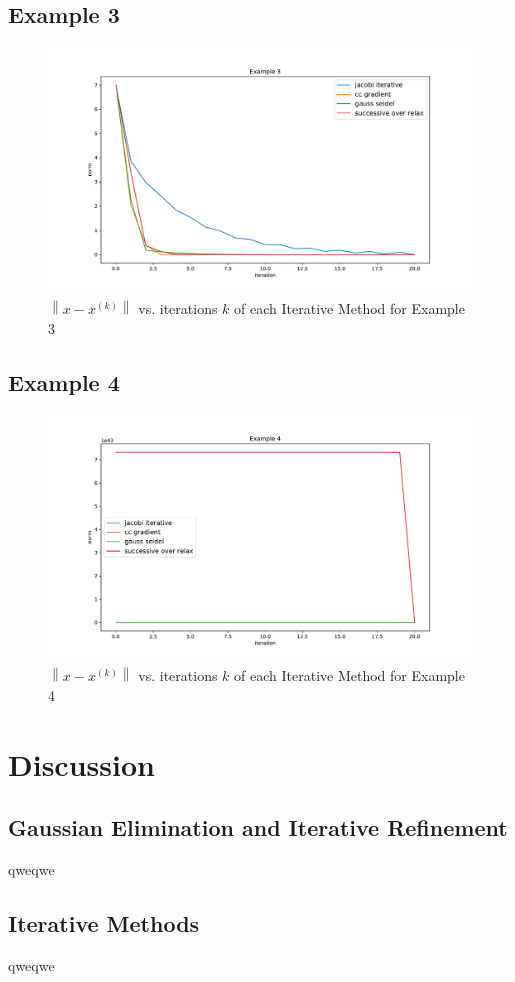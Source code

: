\documentclass[11pt]{article}	%
\newcommand\norm[1]{\left\lVert#1\right\rVert}
\begin{document}
\subsection{Example 3}
\begin{figure}[H]
\centering
\includegraphics[width=.9\textwidth]{3}
\caption{$\norm{x - x^{(k)}}$ vs. iterations $k$ of each Iterative Method for Example 3}
\label{fig:3}
\end{figure}

\subsection{Example 4}
\begin{figure}[H]
\centering
\includegraphics[width=.9\textwidth]{4}
\caption{$\norm{x - x^{(k)}}$ vs. iterations $k$ of each Iterative Method for Example 4}
\label{fig:rk4_predictor_ab4_1}
\end{figure}

\section{Discussion}
\subsection{Gaussian Elimination and Iterative Refinement}
qweqwe
\subsection{Iterative Methods}
qweqwe
\end{document}
